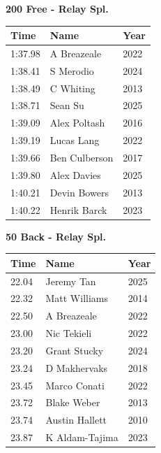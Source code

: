 \vspace{1.2em}
\noindent\begin{minipage}[t]{0.48\textwidth}
\centering
\textbf{\textcolor{teamprimary}{200 Free - Relay Spl.}}\par
\vspace{0.5em}
\centering
\small
\renewcommand{\arraystretch}{1.0}
\setlength{\tabcolsep}{4pt}
\begin{tabular}{@{}p{1.8cm}p{3.0cm}p{1.0cm}@{}}
\toprule
\textbf{Time} & \textbf{Name} & \textbf{Year} \\
\midrule
1:37.98 & A Breazeale & 2022 \\
1:38.41 & S Merodio & 2024 \\
1:38.49 & C Whiting & 2013 \\
1:38.71 & Sean Su & 2025 \\
1:39.09 & Alex Poltash & 2016 \\
1:39.19 & Lucas Lang & 2022 \\
1:39.66 & Ben Culberson & 2017 \\
1:39.80 & Alex Davies & 2025 \\
1:40.21 & Devin Bowers & 2013 \\
1:40.22 & Henrik Barck & 2023 \\
\bottomrule
\end{tabular}
\end{minipage}
\hfill
\begin{minipage}[t]{0.48\textwidth}
\centering
\textbf{\textcolor{teamprimary}{50 Back - Relay Spl.}}\par
\vspace{0.5em}
\centering
\small
\renewcommand{\arraystretch}{1.0}
\setlength{\tabcolsep}{4pt}
\begin{tabular}{@{}p{1.8cm}p{3.0cm}p{1.0cm}@{}}
\toprule
\textbf{Time} & \textbf{Name} & \textbf{Year} \\
\midrule
22.04 & Jeremy Tan & 2025 \\
22.32 & Matt Williams & 2014 \\
22.50 & A Breazeale & 2022 \\
23.00 & Nic Tekieli & 2022 \\
23.20 & Grant Stucky & 2024 \\
23.24 & D Makhervaks & 2018 \\
23.45 & Marco Conati & 2022 \\
23.72 & Blake Weber & 2013 \\
23.74 & Austin Hallett & 2010 \\
23.87 & K Aldam-Tajima & 2023 \\
\bottomrule
\end{tabular}
\end{minipage}
